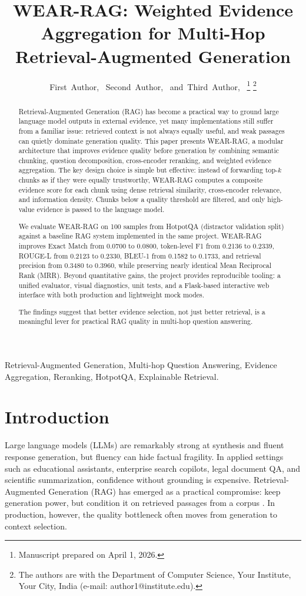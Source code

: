 \documentclass[10pt,draftclsnofoot,onecolumn,journal]{IEEEtran}
\title{WEAR-RAG: Weighted Evidence Aggregation for Multi-Hop Retrieval-Augmented Generation}
\author{First~Author,~\IEEEmembership{Student Member,~IEEE,}
        Second~Author,~\IEEEmembership{Member,~IEEE,}
        and~Third~Author,~\IEEEmembership{Senior Member,~IEEE}%
\thanks{Manuscript prepared on April 1, 2026.}%
\thanks{The authors are with the Department of Computer Science, Your Institute, Your City, India (e-mail: author1@institute.edu).}%
}
\begin{document}
\maketitle

\begin{abstract}
Retrieval-Augmented Generation (RAG) has become a practical way to ground large language model outputs in external evidence, yet many implementations still suffer from a familiar issue: retrieved context is not always equally useful, and weak passages can quietly dominate generation quality. This paper presents WEAR-RAG, a modular architecture that improves evidence quality before generation by combining semantic chunking, question decomposition, cross-encoder reranking, and weighted evidence aggregation. The key design choice is simple but effective: instead of forwarding top-$k$ chunks as if they were equally trustworthy, WEAR-RAG computes a composite evidence score for each chunk using dense retrieval similarity, cross-encoder relevance, and information density. Chunks below a quality threshold are filtered, and only high-value evidence is passed to the language model.

We evaluate WEAR-RAG on 100 samples from HotpotQA (distractor validation split) against a baseline RAG system implemented in the same project. WEAR-RAG improves Exact Match from 0.0700 to 0.0800, token-level F1 from 0.2136 to 0.2339, ROUGE-L from 0.2123 to 0.2330, BLEU-1 from 0.1582 to 0.1733, and retrieval precision from 0.3480 to 0.3960, while preserving nearly identical Mean Reciprocal Rank (MRR). Beyond quantitative gains, the project provides reproducible tooling: a unified evaluator, visual diagnostics, unit tests, and a Flask-based interactive web interface with both production and lightweight mock modes.

The findings suggest that better evidence selection, not just better retrieval, is a meaningful lever for practical RAG quality in multi-hop question answering.
\end{abstract}

\begin{IEEEkeywords}
Retrieval-Augmented Generation, Multi-hop Question Answering, Evidence Aggregation, Reranking, HotpotQA, Explainable Retrieval.
\end{IEEEkeywords}

\section{Introduction}
Large language models (LLMs) are remarkably strong at synthesis and fluent response generation, but fluency can hide factual fragility. In applied settings such as educational assistants, enterprise search copilots, legal document QA, and scientific summarization, confidence without grounding is expensive. Retrieval-Augmented Generation (RAG) has emerged as a practical compromise: keep generation power, but condition it on retrieved passages from a corpus \cite{lewis2020rag}. In production, however, the quality bottleneck often moves from generation to context selection.
\end{document}
